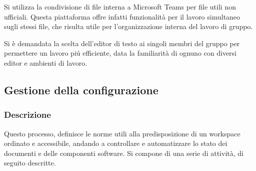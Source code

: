        Si utilizza la condivisione di file interna a Microsoft Teams per file utili non ufficiali. Questa piattaforma offre infatti funzionalità per il lavoro simultaneo sugli stessi file, che risulta utile per l'organizzazione interna del lavoro di gruppo.

        Si è demandata la scelta dell'editor di testo ai singoli membri del gruppo per permettere un lavoro piú efficiente, data la familiarità di ognuno con diversi editor e ambienti di lavoro.

  \subsection{Gestione della configurazione}
    \subsubsection{Descrizione}
      Questo processo, definisce le norme utili alla predisposizione di un workspace ordinato e accessibile, andando a controllare e automatizzare lo stato dei documenti e delle componenti software. Si compone di una serie di attività, di seguito descritte.

